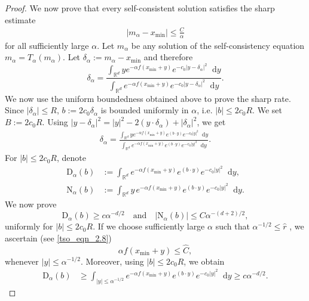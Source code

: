 \documentclass{article}
\newcommand*\der{\mathop{}\!\mathrm{d}}
\numberwithin{equation}{section}
\begin{document}
\begin{proof}
We now prove that every self-consistent solution satisfies the sharp estimate
\begin{align}
    |m_\alpha-x_{\min}|\le \frac{C}{\alpha}
\end{align}
for all sufficiently large $\alpha$. Let $m_\alpha$ be any solution of the self-consistency equation $ m_\alpha=T_\alpha(m_\alpha)$.  Let $\delta_\alpha:=m_\alpha-x_{\min}$ and therefore
\begin{equation*}
    \delta_\alpha = \frac{
    \int_{\mathbb R^d} y e^{-\alpha f(x_{\min}+y)}e^{-c_0|y-\delta_\alpha|^2}\der y}{ \int_{\mathbb R^d}
    e^{-\alpha f(x_{\min}+y)}
    e^{-c_0|y-\delta_\alpha|^2}\der y}.
\end{equation*}
We now use the uniform boundedness obtained above to prove the sharp rate. Since $|\delta_\alpha|\leq R$, $b:=2c_0\delta_\alpha$
is bounded uniformly in $\alpha$, i.e.
$
    |b|\le 2c_0R.
$ We set $B := 2 c_0 R$. 
Using $|y-\delta_\alpha|^2 = |y|^2-2(y\cdot\delta_\alpha) +|\delta_\alpha|^2$, 
we get
\begin{align*}
    \delta_\alpha = \frac{ \int_{\mathbb R^d}
    y e^{-\alpha f(x_{\min}+y)}
    e^{(b\cdot y)}
    e^{-c_0|y|^2}
    \der y}{    \int_{\mathbb R^d}
    e^{-\alpha f(x_{\min}+y)}
    e^{(b\cdot y)}
    e^{-c_0|y|^2}
    \der y}.
\end{align*}
For $|b|\le 2c_0 R$, denote
\begin{align*}
    \mathrm{D}_\alpha(b)
   & :=
    \int_{\mathbb R^d}
    e^{-\alpha f(x_{\min}+y)}
    e^{(b\cdot y)}
    e^{-c_0|y|^2}
    \der y,\\ 
    \mathrm{N}_\alpha(b)
   & :=
    \int_{\mathbb R^d}
    y\,e^{-\alpha f(x_{\min}+y)}
    e^{(b\cdot y)}
    e^{-c_0|y|^2}
    \der y.
\end{align*}
We now prove
\begin{equation}
    \mathrm{D}_\alpha(b)\ge c\alpha^{-d/2}\quad \text{and}\quad
    |\mathrm{N}_\alpha(b)|\le C\alpha^{-(d+2)/2},
\end{equation}
uniformly for $|b|\le 2c_0 R$. If we choose sufficiently large $\alpha $ such that $\alpha^{-1/2} \leq \hat{r}$ , we ascertain (see \eqref{tso_eqn_2.8})
\begin{equation*}
    \alpha f(x_{\min}+y)\le \hat C,
\end{equation*}
whenever $|y| \leq \alpha^{-1/2}$. Moreover, using $|b|\le 2c_0 R$, we obtain
\begin{align}\label{tso_eqn_2.29}
    \mathrm{D}_\alpha(b)
    &\ge
    \int_{|y|\le \alpha^{-1/2}}
    e^{-\alpha f(x_{\min}+y)}
    e^{(b\cdot y)}
    e^{-c_0|y|^2} \der y     \geq     c\alpha^{-d/2}.
\end{align}



\end{proof}
\end{document}
